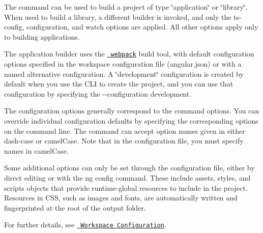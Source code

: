 The command can be used to build a project of type \char`\"{}application\char`\"{} or \char`\"{}library\char`\"{}. When used to build a library, a different builder is invoked, and only the {\ttfamily ts-\/config}, {\ttfamily configuration}, and {\ttfamily watch} options are applied. All other options apply only to building applications.

The application builder uses the \href{https://webpack.js.org/}{\texttt{ webpack}} build tool, with default configuration options specified in the workspace configuration file ({\ttfamily angular.\+json}) or with a named alternative configuration. A \char`\"{}development\char`\"{} configuration is created by default when you use the CLI to create the project, and you can use that configuration by specifying the {\ttfamily -\/-\/configuration development}.

The configuration options generally correspond to the command options. You can override individual configuration defaults by specifying the corresponding options on the command line. The command can accept option names given in either dash-\/case or camel\+Case. Note that in the configuration file, you must specify names in camel\+Case.

Some additional options can only be set through the configuration file, either by direct editing or with the {\ttfamily ng config} command. These include {\ttfamily assets}, {\ttfamily styles}, and {\ttfamily scripts} objects that provide runtime-\/global resources to include in the project. Resources in CSS, such as images and fonts, are automatically written and fingerprinted at the root of the output folder.

For further details, see \href{guide/workspace-config}{\texttt{ Workspace Configuration}}. 